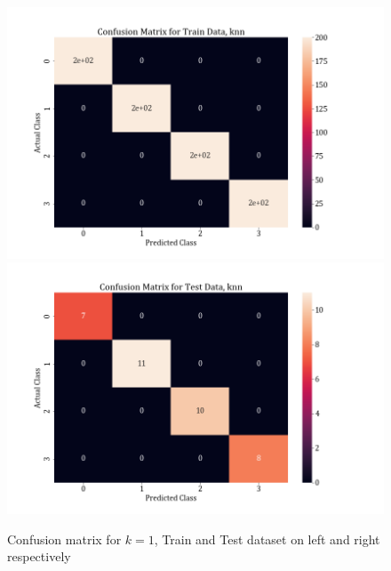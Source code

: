 \documentclass[11pt,a4paper]{article}
\begin{document}
\begin{figure}[H]
    \centering
    \includegraphics[scale=0.8]{images/1a_conf_mat_knn_train.png}
    \includegraphics[scale=0.8]{images/1a_conf_mat_knn_test.png}
    \caption{Confusion matrix for $k=1$, Train and Test dataset on left and right respectively}
    \label{fig:1A_cm_KNN}
\end{figure}
\end{document}
